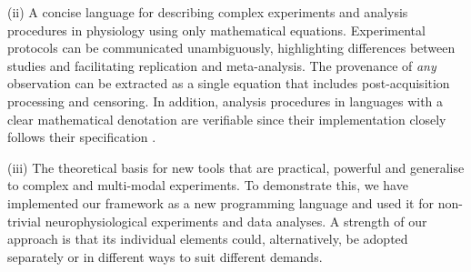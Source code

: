 (ii) A concise language for describing complex experiments and
analysis procedures in physiology using only mathematical
equations. Experimental protocols can be communicated unambiguously,
highlighting differences between studies and facilitating replication
and meta-analysis. The provenance \citep{Pool2002,MacKenzie-Graham2008,
  VanHorn2009} of \emph{any} observation can be extracted as a single
equation that includes post-acquisition processing and censoring. In
addition, analysis procedures in languages with a clear mathematical
denotation are verifiable since their implementation closely
follows their specification \citep{Bird1996}.

(iii) The theoretical basis for new tools that are practical, powerful
and generalise to complex and multi-modal experiments. To demonstrate
this, we have implemented our framework as a new programming language
and used it for non-trivial neurophysiological experiments and data
analyses. A strength of our approach is that its individual elements
could, alternatively, be adopted separately or in different ways to
suit different demands.
